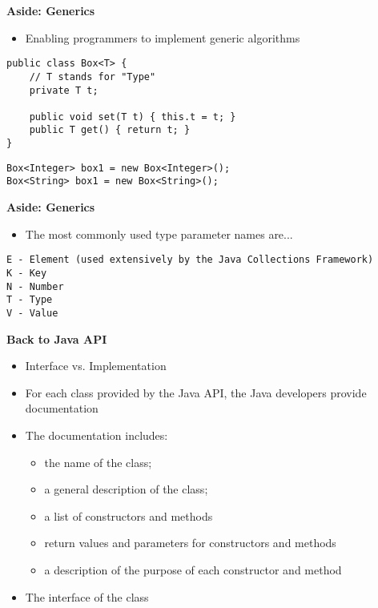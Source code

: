 \documentclass{beamer}
\begin{document}
\begin{frame}[fragile]
\begin{center}
\textbf{Aside: Generics}
\end{center}
\begin{itemize}
\item Enabling programmers to implement generic algorithms
\end{itemize}
\begin{block}{}
\begin{lstlisting}
public class Box<T> {
    // T stands for "Type"
    private T t;

    public void set(T t) { this.t = t; }
    public T get() { return t; }
}
\end{lstlisting}
\end{block}
\begin{block}{}
\begin{lstlisting}
Box<Integer> box1 = new Box<Integer>();
Box<String> box1 = new Box<String>();
\end{lstlisting}
\end{block}
\end{frame} 

\begin{frame}[fragile]
\begin{center}
\textbf{Aside: Generics}
\end{center}
\begin{itemize}
\item The most commonly used type parameter names are...
\end{itemize}
\begin{block}{}
\begin{lstlisting}
E - Element (used extensively by the Java Collections Framework)
K - Key
N - Number
T - Type
V - Value
\end{lstlisting}
\end{block}
\end{frame} 

\begin{frame}
\begin{center}
\textbf{Back to Java API}
\end{center}
\begin{itemize}
\item Interface vs. Implementation
\item For each class provided by the Java API, the Java developers provide documentation
\item The documentation includes:

\begin{itemize}
\item the name of the class;
\item a general description of the class;
\item a list of constructors and methods
\item return values and parameters for constructors and methods
\item a description of the purpose of each constructor and method
\end{itemize}
\item The interface of the class
\end{itemize}
\end{frame} 
\end{document}
